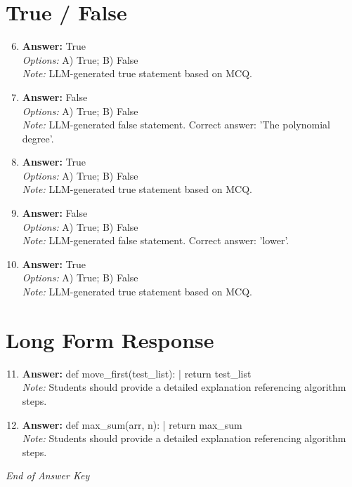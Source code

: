 \documentclass[12pt]{article}
\begin{document}
\section*{True / False}
\begin{enumerate}[label=\arabic*.]
\setcounter{enumi}{5}
\item \textbf{Answer:} True
\\ \textit{Options:} A) True; B) False
\\ \textit{Note:} LLM-generated true statement based on MCQ.
\item \textbf{Answer:} False
\\ \textit{Options:} A) True; B) False
\\ \textit{Note:} LLM-generated false statement. Correct answer: 'The polynomial degree'.
\item \textbf{Answer:} True
\\ \textit{Options:} A) True; B) False
\\ \textit{Note:} LLM-generated true statement based on MCQ.
\item \textbf{Answer:} False
\\ \textit{Options:} A) True; B) False
\\ \textit{Note:} LLM-generated false statement. Correct answer: 'lower'.
\item \textbf{Answer:} True
\\ \textit{Options:} A) True; B) False
\\ \textit{Note:} LLM-generated true statement based on MCQ.
\end{enumerate}

\section*{Long Form Response}
\begin{enumerate}[label=\arabic*.]
\setcounter{enumi}{10}
\item \textbf{Answer:} def move\_first(test\_list): | return test\_list
\\ \textit{Note:} Students should provide a detailed explanation referencing algorithm steps.
\item \textbf{Answer:} def max\_sum(arr, n): | return max\_sum
\\ \textit{Note:} Students should provide a detailed explanation referencing algorithm steps.
\end{enumerate}

\vfill
\noindent\textit{End of Answer Key}
\end{document}
